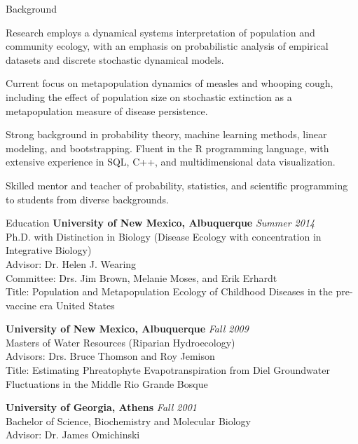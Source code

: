 \documentclass{resume} %
\begin{document}


\begin{rSection}{Background}
\item Research employs a dynamical systems interpretation of
population and community ecology, with an emphasis on probabilistic
analysis of empirical datasets and discrete stochastic dynamical models.
\item Current focus on metapopulation dynamics of measles and whooping
cough, including the effect of population size on stochastic
extinction as a metapopulation measure of disease persistence.
\item Strong background in probability theory, machine learning
methods, linear modeling, and bootstrapping.  Fluent in the R programming language, with extensive experience in SQL, C++, and multidimensional data visualization.
\item Skilled mentor and teacher of
probability, statistics, and scientific programming to students from diverse
backgrounds. 
\end{rSection}

\begin{rSection}{Education}
{\bf University of New Mexico, Albuquerque} \hfill {\em Summer 2014} \\ 
Ph.D. with Distinction in Biology (Disease Ecology with concentration in
Integrative Biology) \\
Advisor: Dr. Helen J. Wearing\\
Committee: Drs. Jim Brown, Melanie Moses, and Erik Erhardt\\
Title: Population and Metapopulation Ecology of
Childhood Diseases in the pre-vaccine era United States

{\bf University of New Mexico, Albuquerque} \hfill {\em Fall 2009} \\ 
Masters of Water Resources (Riparian Hydroecology) \\
Advisors: Drs. Bruce Thomson and Roy Jemison \\
Title: Estimating Phreatophyte Evapotranspiration from Diel Groundwater Fluctuations in the Middle Rio Grande Bosque

{\bf University of Georgia, Athens} \hfill {\em Fall 2001} \\ 
Bachelor of Science, Biochemistry and Molecular Biology \\
Advisor: Dr. James Omichinski
\end{rSection}
\end{document}
